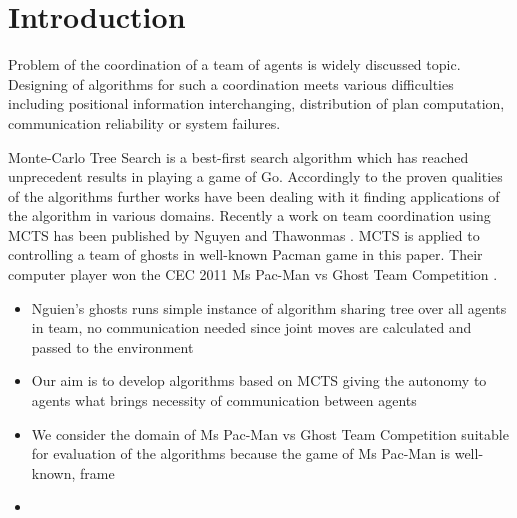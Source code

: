 \chapter*{Introduction}





Problem of the coordination of a team of agents is widely discussed topic.
Designing of algorithms for such a coordination meets various difficulties 
including positional information interchanging, distribution of plan computation, 
communication reliability or system failures.

Monte-Carlo Tree Search is a best-first search algorithm which has
reached unprecedent results in playing a game of Go.
Accordingly to the proven qualities of the algorithms further works have
been dealing with it finding applications of the algorithm in various
domains.
Recently a work on team coordination using MCTS has been published by
Nguyen and Thawonmas \cite{Nguyen2011}.
MCTS is applied to controlling a team of ghosts in well-known Pacman
game in this paper.
Their computer player won the CEC 2011 Ms Pac-Man vs Ghost Team
Competition \cite{PacmanVsGhosts}.

\begin{itemize}
\item Nguien's ghosts runs simple instance of algorithm sharing tree
over all agents in team, no communication needed since joint moves are
calculated and passed to the environment
\item Our aim is to develop algorithms based on MCTS giving the autonomy
to agents what brings necessity of communication between agents
\item We consider the domain of Ms Pac-Man vs Ghost Team Competition
suitable for evaluation of the algorithms because the game of Ms Pac-Man
is well-known, frame
\item
\end{itemize}



